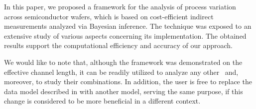 In this paper, we proposed a framework for the analysis of process variation across semiconductor wafers, which is based on cost-efficient indirect measurements analyzed via Bayesian inference.
The technique was exposed to an extensive study of various aspects concerning its implementation.
The obtained results support the computational efficiency and accuracy of our approach.

We would like to note that, although the framework was demonstrated on the effective channel length, it can be readily utilized to analyze any other \qois\ and, moreover, to study their combinations.
In addition, the user is free to replace the data model described in  with another model, serving the same purpose, if this change is considered to be more beneficial in a different context.
